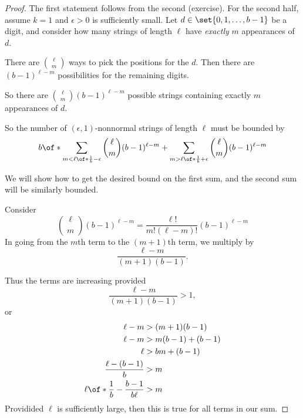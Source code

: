 \documentclass{article}
\begin{document}
\begin{proof}
    The first statement follows from the second 
    (exercise). For the second half, assume 
    $k=1$ and $\epsilon > 0$ is 
    sufficiently small. Let $d\in \set{0,1,\ldots, b-1}$
    be a digit, and consider how many strings of length
    $\ell$ have \emph{exactly} $m$ appearances of $d$.

    There are $\binom{\ell}{m}$ ways to pick the 
    positions for the $d$.
    Then there are $(b-1)^{\ell-m}$ possibilities
    for the remaining digits.

    So there are $\binom{\ell}{m} (b-1)^{\ell -m }$
    possible strings containing exactly $m$ appearances 
    of $d$.

    So the number of $(\epsilon,1)$-nonnormal strings of 
    length $\ell$ must be bounded by 
    \[
        b
        \of*{
            \sum_{m< \ell\of*{\frac{1}{b}-\epsilon}}
            \binom{\ell}{m}(b-1)^{\ell-m}
            +
            \sum_{m > \ell\of*{\frac{1}{b} + \epsilon}}
            \binom{\ell}{m}(b-1)^{\ell-m}
        }
    \]

    We will show how to get the desired bound on
    the first sum, and the second sum will be 
    similarly bounded.

    Consider 
    \[
        \binom{\ell}{m} (b-1)^{\ell-m}
        = \frac{\ell!}{m!(\ell-m)!}(b-1)^{\ell-m}
    \]
    In going from the $m$th term to the $(m+1)$th 
    term, we multiply by 
    \[\frac{\ell-m}{(m+1)(b-1)}.\]

    Thus the terms are increasing provided 
    \[\frac{\ell-m}{(m+1)(b-1)} > 1,\]
    or
    \begin{align*}
        \ell-m 
        &>
        (m+1)(b-1)
        \\
        \ell - m 
        & > m(b-1) + (b-1) 
        \\
        \ell 
        &> bm + (b-1)
        \\
        \frac{\ell - (b -1)}{b} 
        &> m
        \\
        \ell\of*{\frac{1}{b} - \frac{b-1}{b\ell}}
        &> m 
    \end{align*}
    Providided $\ell$ is sufficiently large, then 
    this is true for all terms in our sum.


\end{proof}
\end{document}
